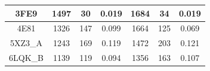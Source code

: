 \begin{table}[H]
{\begin{tabular}{ccccccc}
3FE9                                                              & \multicolumn{1}{c}{1497}                                                                                              & \multicolumn{1}{c}{30}                                                                                                 & 0.019                                                                             & \multicolumn{1}{c}{1684}                                                                                              & \multicolumn{1}{c}{34}                                                                                                 & 0.019                                                                             \\ \midrule
4E81                                                              & \multicolumn{1}{c}{1326}                                                                                              & \multicolumn{1}{c}{147}                                                                                                & 0.099                                                                             & \multicolumn{1}{c}{1664}                                                                                              & \multicolumn{1}{c}{125}                                                                                                & 0.069                                                                             \\ \midrule
5XZ3\_A                                                           & \multicolumn{1}{c}{1243}                                                                                              & \multicolumn{1}{c}{169}                                                                                                & 0.119                                                                             & \multicolumn{1}{c}{1472}                                                                                              & \multicolumn{1}{c}{203}                                                                                                & 0.121                                                                             \\ \midrule
6LQK\_B                                                           & \multicolumn{1}{c}{1139}                                                                                              & \multicolumn{1}{c}{119}                                                                                                & 0.094                                                                             & \multicolumn{1}{c}{1356}                                                                                              & \multicolumn{1}{c}{163}                                                                                                & 0.107                                                                             \\ \bottomrule

\end{tabular}}
\end{table}

